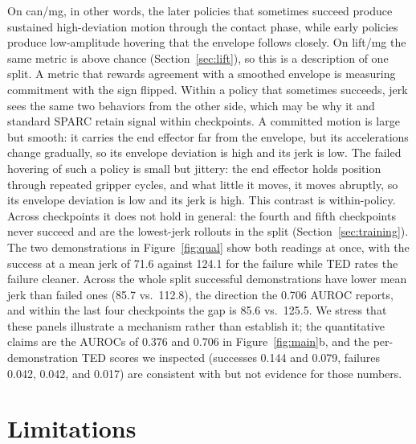 \documentclass[10pt]{article}
\begin{document}
On can/mg, in other words, the later policies that sometimes succeed
produce sustained high-deviation motion through the contact phase, while
early policies produce low-amplitude hovering that the envelope follows
closely. On lift/mg the same metric is above chance
(Section~\ref{sec:lift}), so this is a description of one split. A
metric that rewards agreement with a smoothed envelope is measuring
commitment with the sign flipped. Within a policy that sometimes succeeds,
jerk sees the same two behaviors from the other side, which may be why it
and standard SPARC retain signal within checkpoints. A committed motion is
large but smooth: it carries the end effector far from the envelope, but
its accelerations change gradually, so its envelope deviation is high and
its jerk is low. The failed hovering of such a policy is small but jittery:
the end effector holds position through repeated gripper cycles, and what
little it moves, it moves abruptly, so its envelope deviation is low and
its jerk is high. This contrast is within-policy. Across checkpoints it does
not hold in general: the fourth and fifth checkpoints never succeed and are
the lowest-jerk rollouts in the split (Section~\ref{sec:training}). The two
demonstrations in Figure~\ref{fig:qual} show both readings at once, with
the success at a mean jerk of 71.6 against 124.1 for the failure while TED
rates the failure cleaner. Across the whole split successful demonstrations
have lower mean jerk than failed ones (85.7 vs.\ 112.8), the direction the
0.706 AUROC reports, and within the last four checkpoints the gap is 85.6
vs.\ 125.5.
We stress that these panels illustrate a mechanism rather than
establish it; the quantitative claims are the AUROCs of 0.376 and 0.706 in
Figure~\ref{fig:main}b, and the per-demonstration TED scores we inspected
(successes 0.144 and 0.079, failures 0.042, 0.042, and 0.017) are
consistent with but not evidence for those numbers.

\section{Limitations}
\label{sec:limitations}
\end{document}
